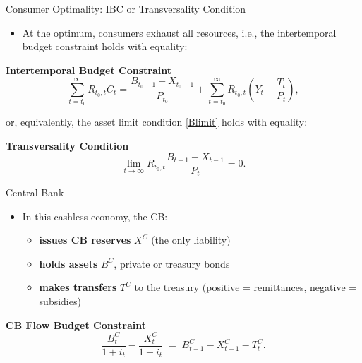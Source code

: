 \documentclass[11pt,aspectratio=169]{beamer}
\begin{document}
\begin{frame}{Consumer Optimality: IBC or Transversality Condition}

\begin{itemize}
    \item At the optimum, consumers exhaust all resources, i.e., the intertemporal budget constraint holds with equality:
\end{itemize}
\vspace{0.25cm}

\textbf{Intertemporal Budget Constraint}
\begin{equation}
\sum_{t=t_0}^{\infty} R_{t_0,t} C_t =
\frac{B_{t_0-1}+X_{t_0-1}}{P_{t_0}} +
\sum_{t=t_0}^{\infty} R_{t_0,t} \left( Y_t - \frac{T_t}{P_t} \right),
\label{eq: IBCCE}
\end{equation}

\vspace{0.25cm}
   \hspace{0.7cm} or, equivalently, the asset limit condition \eqref{Blimit} holds with equality:
\vspace{0.25cm}

\textbf{Transversality Condition}
\begin{equation}
\lim_{t \to \infty} R_{t_0,t} \frac{B_{t-1}+X_{t-1}}{P_t} = 0.
\label{eq: Trans}
\end{equation}

\end{frame}

\begin{frame}{Central Bank}

\begin{itemize}
    \item In this cashless economy, the CB: 
    \vspace{0.25cm}
    \begin{itemize}
        \item \textbf{issues CB reserves} $X^{C}$ (the only liability)
    \vspace{0.25cm}
    \item \textbf{holds assets} $B^{C}$, private or treasury bonds 
    \vspace{0.25cm}
    \item \textbf{makes transfers} $T^{C}$ to the treasury (positive = remittances, negative = subsidies)
    \end{itemize}
\end{itemize}

\vspace{0.5cm}
\noindent\textbf{CB Flow Budget Constraint}
\begin{equation}
\frac{B_{t}^{C}}{1+i_{t}}-\frac{X_{t}^{C}}{1+i_{t}}  \;=\; B_{t-1}^{C}-X_{t-1}^{C}- T_{t}^{C} .
\label{CBBC1}
\end{equation}

\end{frame}
\end{document}
